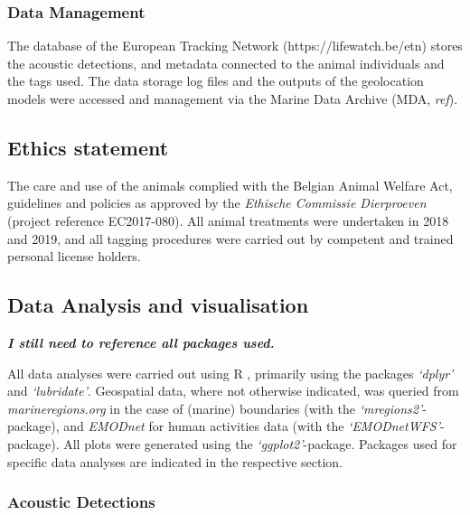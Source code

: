 \documentclass[
  authoryear,
  review,
  3p]{elsarticle}
\begin{document}
\hypertarget{data-management}{%
\subsubsection{Data Management}\label{data-management}}

The database of the European Tracking Network (https://lifewatch.be/etn)
stores the acoustic detections, and metadata connected to the animal
individuals and the tags used. The data storage log files and the
outputs of the geolocation models were accessed and management via the
Marine Data Archive (MDA, \emph{ref}).

\hypertarget{ethics-statement}{%
\subsection{Ethics statement}\label{ethics-statement}}

The care and use of the animals complied with the Belgian Animal Welfare
Act, guidelines and policies as approved by the \emph{Ethische Commissie
Dierproeven} (project reference EC2017-080). All animal treatments were
undertaken in 2018 and 2019, and all tagging procedures were carried out
by competent and trained personal license holders.

\hypertarget{data-analysis-and-visualisation}{%
\subsection{Data Analysis and
visualisation}\label{data-analysis-and-visualisation}}

\textbf{\emph{I still need to reference all packages used.}}

All data analyses were carried out using R \citep{R_2022}, primarily
using the packages \emph{`dplyr'} and \emph{`lubridate'}. Geospatial
data, where not otherwise indicated, was queried from
\emph{marineregions.org} in the case of (marine) boundaries (with the
\emph{`mregions2'}-package), and \emph{EMODnet} for human activities
data (with the \emph{`EMODnetWFS'}-package). All plots were generated
using the \emph{`ggplot2'}-package. Packages used for specific data
analyses are indicated in the respective section.

\hypertarget{acoustic-detections}{%
\subsubsection{Acoustic Detections}\label{acoustic-detections}}
\end{document}
